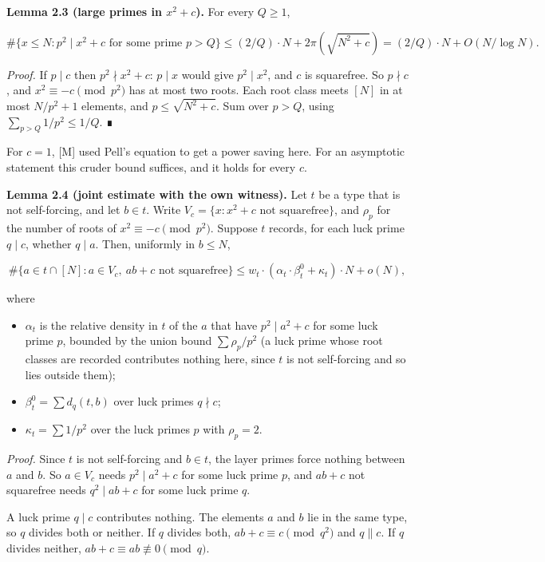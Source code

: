 \documentclass[
  11pt,
]{article}
\providecommand{\tightlist}{%
  \setlength{\itemsep}{0pt}\setlength{\parskip}{0pt}}
\begin{document}
\textbf{Lemma 2.3 (large primes in \(x^2 + c\)).} For every \(Q \ge 1\),

\[\#\{x \le N : p^2 \mid x^2 + c \text{ for some prime } p > Q\} \le (2/Q)\cdot N + 2\pi\left(\sqrt{N^2 + c}\right) = (2/Q)\cdot N + O(N/\log N).\]

\emph{Proof.} If \(p \mid c\) then \(p^2 \nmid x^2 + c\): \(p \mid x\)
would give \(p^2 \mid x^2\), and \(c\) is squarefree. So \(p \nmid c\),
and \(x^2 \equiv -c \pmod{p^2}\) has at most two roots. Each root class
meets \([N]\) in at most \(N/p^2 + 1\) elements, and
\(p \le \sqrt{N^2 + c}\). Sum over \(p > Q\), using
\(\sum_{p>Q} 1/p^2 \le 1/Q\). ∎

For \(c = 1\), {[}M{]} used Pell's equation to get a power saving here.
For an asymptotic statement this cruder bound suffices, and it holds for
every \(c\).

\textbf{Lemma 2.4 (joint estimate with the own witness).} Let \(t\) be a
type that is not self-forcing, and let \(b \in t\). Write
\(V_c = \{x : x^2 + c \text{ not squarefree}\}\), and \(\rho_p\) for the
number of roots of \(x^2 \equiv -c \pmod{p^2}\). Suppose \(t\) records,
for each luck prime \(q \mid c\), whether \(q \mid a\). Then, uniformly
in \(b \le N\),

\[\#\{a \in t \cap [N] : a \in V_c,\ ab + c \text{ not squarefree}\} \le w_t\cdot(\alpha_t\cdot\beta^0_t + \kappa_t)\cdot N + o(N),\]

where

\begin{itemize}
\tightlist
\item
  \(\alpha_t\) is the relative density in \(t\) of the \(a\) that have
  \(p^2 \mid a^2 + c\) for some luck prime \(p\), bounded by the union
  bound \(\sum \rho_p/p^2\) (a luck prime whose root classes are
  recorded contributes nothing here, since \(t\) is not self-forcing and
  so lies outside them);
\item
  \(\beta^0_t = \sum d_q(t, b)\) over luck primes \(q \nmid c\);
\item
  \(\kappa_t = \sum 1/p^2\) over the luck primes \(p\) with
  \(\rho_p = 2\).
\end{itemize}

\emph{Proof.} Since \(t\) is not self-forcing and \(b \in t\), the layer
primes force nothing between \(a\) and \(b\). So \(a \in V_c\) needs
\(p^2 \mid a^2 + c\) for some luck prime \(p\), and \(ab + c\) not
squarefree needs \(q^2 \mid ab + c\) for some luck prime \(q\).

A luck prime \(q \mid c\) contributes nothing. The elements \(a\) and
\(b\) lie in the same type, so \(q\) divides both or neither. If \(q\)
divides both, \(ab + c \equiv c \pmod{q^2}\) and \(q \parallel c\). If
\(q\) divides neither, \(ab + c \equiv ab \not\equiv 0 \pmod{q}\).
\end{document}
